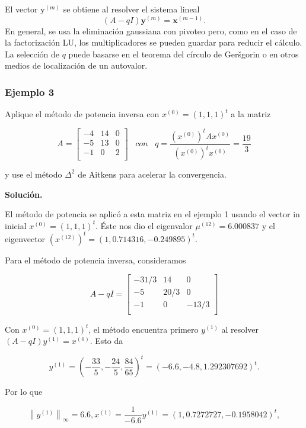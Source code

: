 \documentclass{report}
\numberwithin{subsection}{section} %
\begin{document}
El vector $\text{y}^{\left( m \right)}$ se obtiene al resolver el sistema lineal
\begin{equation*}
\left( A - qI \right) \textbf{y}^{\left( m \right)} = \textbf{x}^{\left( m - 1 \right)}.
\end{equation*}
En general, se usa la eliminación gaussiana con pivoteo pero, como en el caso de la factorización LU, los multiplicadores se pueden guardar para reducir el cálculo. La selección de $q$ puede basarse en el teorema del círculo de Geršgorin o en otros medios de localización de un autovalor.

\subsubsection*{Ejemplo 3}

Aplique el método de potencia inversa con $x^{(0)} = (1, 1, 1)^t$ a la matriz

$$A =\begin{bmatrix}
    -4 & 14 & 0 \\
    -5 & 13 & 0 \\
    -1 & 0 & 2 \\
\end{bmatrix} \;\;\; con \;\;\; q = \frac{(x^{(0)})^t Ax^{(0)}}{(x^{(0)})^tx^{(0)}} = \frac{19}{3}$$

y use el método $\Delta^2$ de Aitkens para acelerar la convergencia.

{\bf Solución.}

El método de potencia se aplicó a esta matriz en el ejemplo 1 usando el vector in inicial $x^{(0)} = (1,1,1)^t.$ Éste nos dio el eigenvalor $\mu^{(12)} = 6.000837$ y el eigenvector $(x^{(12)})^t = (1, 0.714316, -0.249895)^t$.

Para el método de potencia inversa, consideramos

$$A - qI =\begin{bmatrix}
    -31/3 & 14 & 0 \\
    -5 & 20/3 & 0 \\
    -1 & 0 & -13/3 \\
\end{bmatrix}$$

Con $x^(0) = (1, 1, 1)^t$, el método encuentra primero $y^{(1)}$ al resolver $(A- qI)y^{(1)} = x^(0)$. Esto da

$$y^{(1)} = (-\frac{33}{5},-\frac{24}{5},\frac{84}{65})^t = (-6.6,-4.8, 1.292307692)^t.$$

Por lo que

$$\left\|y^{(1)}\right\|_{\infty} = 6.6, x^{(1)} = \frac{1}{-6.6}y^{(1)} = (1, 0.7272727,-0.1958042)^t,$$
\end{document}

